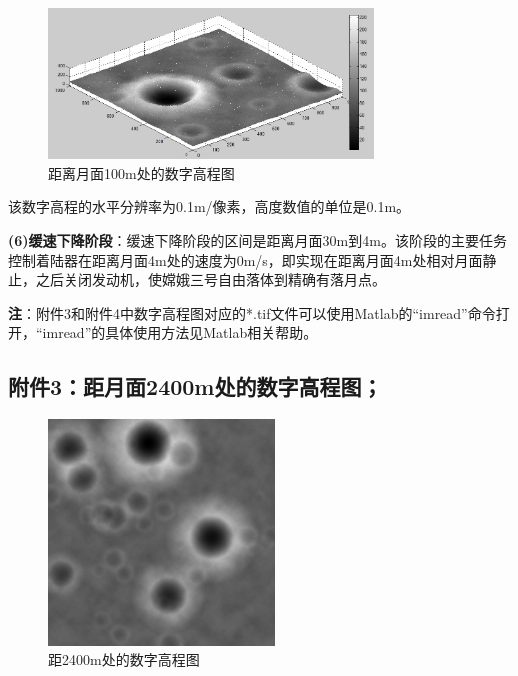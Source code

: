             \begin{figure}[H]
            \centering
            \includegraphics[height=4cm]{images/100m_number.jpg}
            \caption{距离月面100m处的数字高程图}
            \label{fig:距离月面100m处的数字高程图}
            \end{figure}
            \par
            该数字高程的水平分辨率为0.1m/像素，高度数值的单位是0.1m。
            \par
            \textbf{(6)缓速下降阶段}：缓速下降阶段的区间是距离月面30m到4m。该阶段的主要任务控制着陆器在距离月面4m处的速度为0m/s，即实现在距离月面4m处相对月面静止，之后关闭发动机，使嫦娥三号自由落体到精确有落月点。
            \par
            \textbf{注}：附件3和附件4中数字高程图对应的*.tif文件可以使用Matlab的“imread”命令打开，“imread”的具体使用方法见Matlab相关帮助。
    \subsection{附件3：距月面2400m处的数字高程图；}
            \begin{figure}[H]
            \centering
            \includegraphics[height=6cm]{images/2400m_number2.png}
            \caption{距2400m处的数字高程图}
            \label{fig:距2400m处的数字高程图}
            \end{figure}
